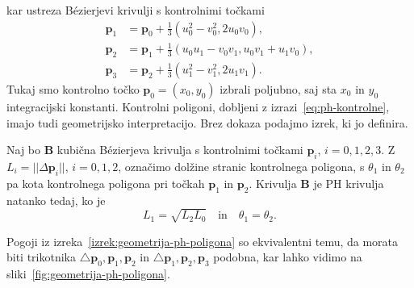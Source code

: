 \documentclass[isrm2, tisk]{fmfdelo}
\newcommand{\p}{\mathbf{p}}
\begin{document}
    kar ustreza Bézierjevi krivulji s kontrolnimi točkami
    \begin{align}
        \p_1 &=\p_0+\frac{1}{3}(u_0^2-v_0^2,2u_0v_0), \nonumber\\
        \p_2 &= \p_1+\frac{1}{3}(u_0u_1-v_0v_1, u_0v_1+u_1v_0),\label{eq:ph-kontrolne}\\
        \p_3 &= \p_2 + \frac{1}{3}(u_1^2-v_1^2, 2u_1v_1). \nonumber
    \end{align}
    Tukaj smo kontrolno točko $\p_0=(x_0,y_0)$ izbrali poljubno, saj sta $x_0$ in $y_0$ integracijski konstanti.
    Kontrolni poligoni, dobljeni z izrazi~\eqref{eq:ph-kontrolne}, imajo tudi geometrijsko interpretacijo.
    Brez dokaza podajmo izrek, ki jo definira.
    \begin{izrek}
        \label{izrek:geometrija-ph-poligona}
        Naj bo $\mathbf{B}$ kubična Bézierjeva krivulja s kontrolnimi točkami $\p_i$, $i=0,1,2,3$.
        Z $L_i=||\Delta \p_i||$, $i=0,1,2$, označimo dolžine stranic kontrolnega poligona, s $\theta_1$ in $\theta_2$ pa kota kontrolnega poligona pri točkah $\p_1$ in  $\p_2$.
        Krivulja $\mathbf{B}$ je PH krivulja natanko tedaj, ko je
        \[L_1=\sqrt{L_2L_0}\quad \text{in} \quad \theta_1=\theta_2 .\]
    \end{izrek}
    \noindent Pogoji iz izreka~\ref{izrek:geometrija-ph-poligona} so ekvivalentni temu, da morata biti trikotnika $\triangle \p_0,\p_1,\p_2$ in $\triangle \p_1,\p_2,\p_3$ podobna, kar lahko vidimo na sliki~\ref{fig:geometrija-ph-poligona}.
\end{document}

